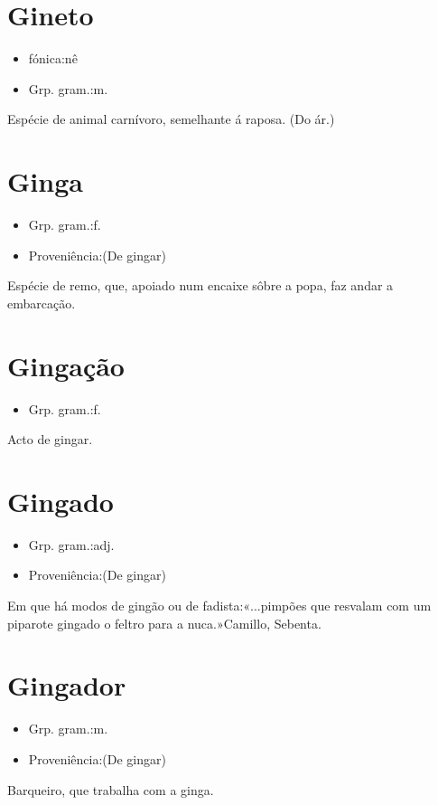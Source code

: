 \section{Gineto}
\begin{itemize}
\item {fónica:nê}
\end{itemize}
\begin{itemize}
\item {Grp. gram.:m.}
\end{itemize}
Espécie de animal carnívoro, semelhante á raposa.
(Do ár.)
\section{Ginga}
\begin{itemize}
\item {Grp. gram.:f.}
\end{itemize}
\begin{itemize}
\item {Proveniência:(De \textunderscore gingar\textunderscore )}
\end{itemize}
Espécie de remo, que, apoiado num encaixe sôbre a popa, faz andar a embarcação.
\section{Gingação}
\begin{itemize}
\item {Grp. gram.:f.}
\end{itemize}
Acto de gingar.
\section{Gingado}
\begin{itemize}
\item {Grp. gram.:adj.}
\end{itemize}
\begin{itemize}
\item {Proveniência:(De \textunderscore gingar\textunderscore )}
\end{itemize}
Em que há modos de gingão ou de fadista:«\textunderscore ...pimpões que resvalam com um piparote gingado o feltro para a nuca.\textunderscore »Camillo, \textunderscore Sebenta\textunderscore .
\section{Gingador}
\begin{itemize}
\item {Grp. gram.:m.}
\end{itemize}
\begin{itemize}
\item {Proveniência:(De \textunderscore gingar\textunderscore )}
\end{itemize}
Barqueiro, que trabalha com a ginga.
